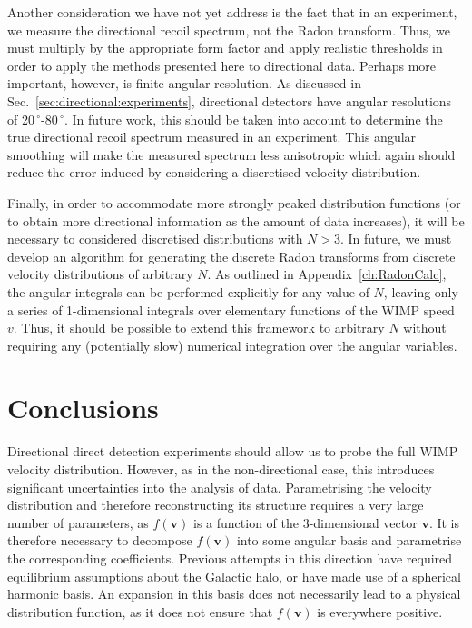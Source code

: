 Another consideration we have not yet address is the fact that in an experiment, we measure the directional recoil spectrum, not the Radon transform. Thus, we must multiply by the appropriate form factor and apply realistic thresholds in order to apply the methods presented here to directional data. Perhaps more important, however, is finite angular resolution. As discussed in Sec.~\ref{sec:directional:experiments}, directional detectors have angular resolutions of 20$\,^{\circ}$-80$\,^{\circ}$. In future work, this should be taken into account to determine the true directional recoil spectrum measured in an experiment. This angular smoothing will make the measured spectrum less anisotropic which again should reduce the error induced by considering a discretised velocity distribution.

Finally, in order to accommodate more strongly peaked distribution functions (or to obtain more directional information as the amount of data increases), it will be necessary to considered discretised distributions with $N > 3$. In future, we must develop an algorithm for generating the discrete Radon transforms from discrete velocity distributions of arbitrary $N$. As outlined in Appendix~\ref{ch:RadonCalc}, the angular integrals can be performed explicitly for any value of $N$, leaving only a series of 1-dimensional integrals over elementary functions of the WIMP speed $v$. Thus, it should be possible to extend this framework to arbitrary $N$ without requiring any (potentially slow) numerical integration over the angular variables.

\section{Conclusions}

Directional direct detection experiments should allow us to probe the full WIMP velocity distribution. However, as in the non-directional case, this introduces significant uncertainties into the analysis of data. Parametrising the velocity distribution and therefore reconstructing its structure requires a very large number of parameters, as $f(\mathbf{v})$ is a function of the 3-dimensional vector $\mathbf{v}$. It is therefore necessary to decompose $f(\mathbf{v})$ into some angular basis and parametrise the corresponding coefficients. Previous attempts in this direction have required equilibrium assumptions about the Galactic halo, or have made use of a spherical harmonic basis. An expansion in this basis does not necessarily lead to a physical distribution function, as it does not ensure that $f(\textbf{v})$ is everywhere positive.

